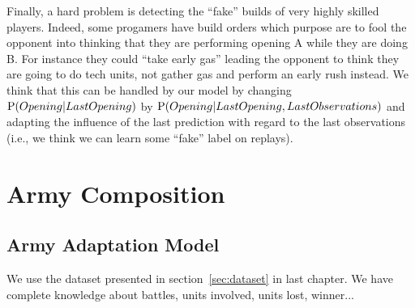 Finally, a hard problem is detecting the ``fake'' builds of very highly skilled players. Indeed, some progamers have build orders which purpose are to fool the opponent into thinking that they are performing opening A while they are doing B. For instance they could ``take early gas'' leading the opponent to think they are going to do tech units, not gather gas 
and perform an early rush instead. We think that this can be handled by our model by changing $\mathrm{P}(Opening|LastOpening)$ by $\mathrm{P}(Opening|LastOpening, LastObservations)$ and adapting the influence of the last prediction with regard to the last observations (i.e., we think we can learn some ``fake'' label on replays).


\clearpage
\section{Army Composition}
\subsection{Army Adaptation Model}
We use the dataset presented in section~\ref{sec:dataset} in last chapter. We have complete knowledge about battles, units involved, units lost, winner...

